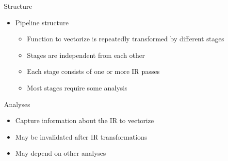 \begin{frame}{Structure}

\begin{itemize}
    \item Pipeline structure
    \begin{itemize}
        \item Function to vectorize is repeatedly transformed by different stages
        \item Stages are independent from each other
        \item Each stage consists of one or more IR passes
        \item Most stages require some analysis
    \end{itemize}
\end{itemize}


\end{frame}


\begin{frame}{Analyses}

\begin{itemize}
    \item Capture information about the IR to vectorize
    \item May be invalidated after IR transformations
    \item May depend on other analyses
\end{itemize}

\end{frame}


